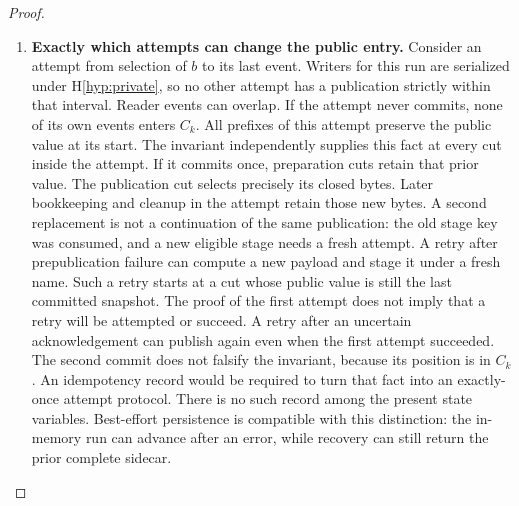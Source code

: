 \documentclass[12pt]{article}
\begin{document}
\begin{proof}
\begin{enumerate}
\item \textbf{Exactly which attempts can change the public entry.}
Consider an attempt from selection of $b$ to its last event.
Writers for this run are serialized under H\ref{hyp:private},
so no other attempt has a publication strictly within that
interval. Reader events can overlap.
If the attempt never commits, none of its own events enters
$C_k$. All prefixes of this attempt preserve the public value
at its start. The invariant independently supplies this
fact at every cut inside the attempt.
If it commits once, preparation cuts retain that prior value.
The publication cut selects precisely its closed bytes.
Later bookkeeping and cleanup in the attempt retain those
new bytes. A second replacement is not a continuation of the
same publication: the old stage key was consumed, and a new
eligible stage needs a fresh attempt.
A retry after prepublication failure can compute a new payload
and stage it under a fresh name. Such a retry starts at a cut
whose public value is still the last committed snapshot.
The proof of the first attempt does not imply that a retry
will be attempted or succeed.
A retry after an uncertain acknowledgement can publish again
even when the first attempt succeeded. The second commit
does not falsify the invariant, because its position is in $C_k$.
An idempotency record would be required to turn that fact into
an exactly-once attempt protocol. There is no such record
among the present state variables.
Best-effort persistence is compatible with this distinction:
the in-memory run can advance after an error, while recovery
can still return the prior complete sidecar.


\end{enumerate}
\end{proof}
\end{document}
